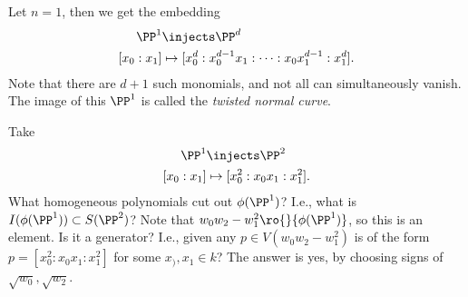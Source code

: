 \begin{example}

Let \(n=1\), then we get the embedding
\begin{align*}  
\PP^1 &\injects \PP^d \\
[x_0: x_1] &\mapsto [x_0^d: x_0^{d-1}x_1 : \cdots : x_0 x_1^{d-1} : x_1^d]
.\end{align*} Note that there are \(d+1\) such monomials, and not all
can simultaneously vanish. The image of this \(\PP^1\) is called the
\emph{twisted normal curve}.

\end{example}

\begin{example}[?]

Take
\begin{align*}  
\PP^1 &\injects \PP^2 \\
[x_0 : x_1] &\mapsto [x_0^2 : x_0 x_1: x_1^2]
.\end{align*} What homogeneous polynomials cut out \(\phi(\PP^1)\)?
I.e., what is \(I(\phi(\PP^1)) \subset S(\PP^2)\)? Note that
\(w_0 w_2 - w_1^2 \ro{}{\phi(\PP^1)}\), so this is an element. Is it a
generator? I.e., given any \(p\in V(w_0 w_2 - w_1^2)\) is of the form
\(p = [x_0^2 : x_0 x_1: x_1^2]\) for some \(x_), x_1 \in k\)? The answer
is yes, by choosing signs of \(\sqrt{w_0}, \sqrt{w_2}\).

\end{example}

